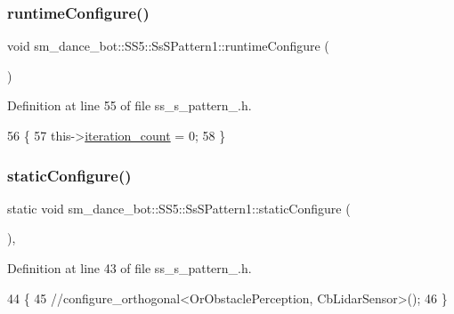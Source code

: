 \subsubsection{\texorpdfstring{runtime\+Configure()}{runtimeConfigure()}}
{\footnotesize\ttfamily void sm\+\_\+dance\+\_\+bot\+::\+S\+S5\+::\+Ss\+S\+Pattern1\+::runtime\+Configure (\begin{DoxyParamCaption}{ }\end{DoxyParamCaption})\hspace{0.3cm}{\ttfamily [inline]}}



Definition at line 55 of file ss\+\_\+s\+\_\+pattern\+\_.\+h.


\begin{DoxyCode}
56     \{
57         this->\hyperlink{structsm__dance__bot_1_1SS5_1_1SsSPattern1_ac1b4a50a642face1106fd58d026067ac}{iteration\_count} = 0;
58     \}
\end{DoxyCode}
\mbox{\label{structsm__dance__bot_1_1SS5_1_1SsSPattern1_a203b4e61bea71a82f1b56b19ac25bf59}} 
\subsubsection{\texorpdfstring{static\+Configure()}{staticConfigure()}}
{\footnotesize\ttfamily static void sm\+\_\+dance\+\_\+bot\+::\+S\+S5\+::\+Ss\+S\+Pattern1\+::static\+Configure (\begin{DoxyParamCaption}{ }\end{DoxyParamCaption})\hspace{0.3cm}{\ttfamily [inline]}, {\ttfamily [static]}}



Definition at line 43 of file ss\+\_\+s\+\_\+pattern\+\_.\+h.


\begin{DoxyCode}
44     \{
45         \textcolor{comment}{//configure\_orthogonal<OrObstaclePerception, CbLidarSensor>();}
46     \}
\end{DoxyCode}
\mbox{\label{structsm__dance__bot_1_1SS5_1_1SsSPattern1_a85e3580f9375fde963ea4204305ad27d}} 
